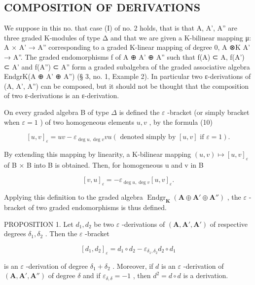 \subsection{COMPOSITION OF DERIVATIONS}

We suppose in this no. that case (I) of no. 2 holds, that is that A, A', A'' are three graded K-modules of type Δ and that we are given a K-bilinear mapping μ: A × A' → A'' corresponding to a graded K-linear mapping of degree 0, A ⊗K A' → A''. The graded endomorphisms f of A ⊕ A' ⊕ A'' such that f(A) ⊂ A, f(A') ⊂ A' and f(A'') ⊂ A'' form a graded subalgebra of the graded associative algebra EndgrK(A ⊕ A' ⊕ A'') (§ 3, no. 1, Example 2). In particular two ε-derivations of (A, A', A'') can be composed, but it should not be thought that the composition of two ε-derivations is an ε-derivation.

On every graded algebra B of type \(\Delta\) is defined the \(\varepsilon\) -bracket (or simply bracket when \(\varepsilon = 1\) ) of two homogeneous elements \(u, v\) , by the formula (10)

\[
[ u, v ] _ {\varepsilon} = u v - \varepsilon_ {\deg u, \deg v} v u (\text { denoted   simply   by } [ u, v ] \text { if } \varepsilon = 1).
\]

By extending this mapping by linearity, a K-bilinear mapping \((u, v) \mapsto [u, v]_{\varepsilon}\) of B × B into B is obtained. Then, for homogeneous u and v in B

\[
[ v, u ] _ {\varepsilon} = - \varepsilon_ {\deg u, \deg v} [ u, v ] _ {\varepsilon}.
\]

Applying this definition to the graded algebra \(\operatorname{Endgr}_{\mathbf{K}}(\mathbf{A} \oplus \mathbf{A}' \oplus \mathbf{A}'')\) , the \(\varepsilon\) -bracket of two graded endomorphisms is thus defined.

PROPOSITION 1. Let \(d_1, d_2\) be two \(\varepsilon\) -derivations of \((\mathbf{A}, \mathbf{A}', \mathbf{A} ' )\) of respective degrees \(\delta_1, \delta_2\) . Then the \(\varepsilon\) -bracket

\[
[ d _ {1}, d _ {2} ] _ {\varepsilon} = d _ {1} \circ d _ {2} - \varepsilon_ {\delta_ {1}, \delta_ {2}} d _ {2} \circ d _ {1}
\]

is an \(\varepsilon\) -derivation of degree \(\delta_1 + \delta_2\) . Moreover, if \(d\) is an \(\varepsilon\) -derivation of \((\mathbf{A}, \mathbf{A}', \mathbf{A}'')\) of degree \(\delta\) and if \(\varepsilon_{\delta, \delta} = -1\) , then \(d^2 = d \circ d\) is a derivation.

